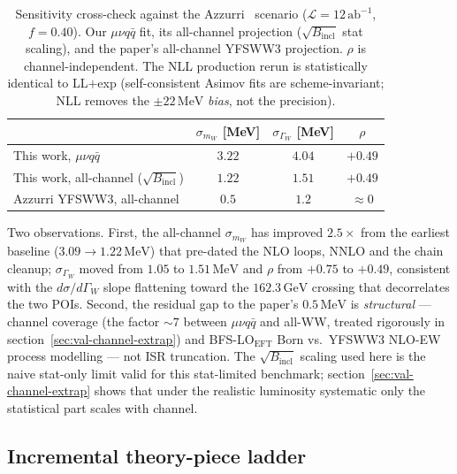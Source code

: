 \documentclass[11pt,a4paper]{article}
\newcommand{\mW}{m_W}
\newcommand{\GammaW}{\Gamma_W}
\newcommand{\GeV}{\ensuremath{\,\mathrm{GeV}}}
\newcommand{\MeV}{\ensuremath{\,\mathrm{MeV}}}
\begin{document}
\begin{table}[h]
\centering
\caption{Sensitivity cross-check against the Azzurri~\cite{Azzurri2021}
scenario ($\mathcal{L}=12\,\text{ab}^{-1}$, $f=0.40$). Our $\mu\nu q\bar q$
fit, its all-channel projection ($\sqrt{B_\text{incl}}$ stat scaling), and
the paper's all-channel YFSWW3 projection. $\rho$ is channel-independent.
The NLL production rerun is statistically identical to LL$+$exp
(self-consistent Asimov fits are scheme-invariant; NLL removes the
$\pm22\MeV$ \emph{bias}, not the precision).}
\label{tab:azzurri-xcheck}
\begin{tabular}{l c c c}
\toprule
 & $\sigma_{\mW}$ [MeV] & $\sigma_{\GammaW}$ [MeV] & $\rho$ \\
\midrule
This work, $\mu\nu q\bar q$                & $3.22$ & $4.04$ & $+0.49$ \\
This work, all-channel ($\sqrt{B_\text{incl}}$) & $1.22$ & $1.51$ & $+0.49$ \\
Azzurri YFSWW3, all-channel               & $0.5$  & $1.2$  & $\approx 0$ \\
\bottomrule
\end{tabular}
\end{table}

Two observations. First, the all-channel $\sigma_{\mW}$ has improved
$2.5\times$ from the earliest baseline ($3.09\to1.22\MeV$) that
pre-dated the NLO loops, NNLO and the chain cleanup; $\sigma_{\GammaW}$
moved from $1.05$ to $1.51\MeV$ and $\rho$ from $+0.75$ to $+0.49$,
consistent with the $d\sigma/d\GammaW$ slope flattening toward the
$162.3\GeV$ crossing that decorrelates the two POIs. Second, the residual
gap to the paper's $0.5\MeV$ is \emph{structural} --- channel coverage
(the factor $\sim\!7$ between $\mu\nu q\bar q$ and all-WW, treated
rigorously in section~\ref{sec:val-channel-extrap}) and BFS-LO$_\text{EFT}$
Born vs.\ YFSWW3 NLO-EW process modelling --- not ISR truncation. The
$\sqrt{B_\text{incl}}$ scaling used here is the naive stat-only limit valid
for this stat-limited benchmark; section~\ref{sec:val-channel-extrap} shows
that under the realistic luminosity systematic only the statistical part
scales with channel.

\subsection{Incremental theory-piece ladder}\label{sec:val-theory-ladder}
\end{document}
